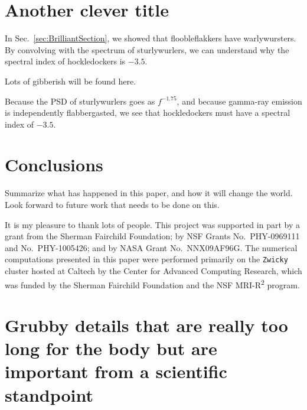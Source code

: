 \documentclass[reprint, aps, prd, letterpaper, noshowpacs, amsmath, %
amssymb, amsfonts, nofootinbib, floatfix, superscriptaddress, %
twoside]{revtex4-1}
\begin{document}
\section{Another clever title}
\label{sec:AnotherCleverOne}
In Sec.~\ref{sec:BrilliantSection}, we showed that floobleflakkers
have warlywursters.  By convolving with the spectrum of sturlywurlers,
we can understand why the spectral index of hockledockers is $-3.5$.

Lots of gibberish will be found here.

Because the PSD of sturlywurlers goes as $f^{-1.75}$, and because
gamma-ray emission is independently flabbergasted, we see that
hockledockers must have a spectral index of $-3.5$.


\section{Conclusions}
\label{sec:Conclusions}
Summarize what has happened in this paper, and how it will change the
world.  Look forward to future work that needs to be done on this.


\begin{acknowledgments}
  It is my pleasure to thank lots of people.  This project was
  supported in part by a grant from the Sherman Fairchild Foundation;
  by NSF Grants No.\ PHY-0969111 and No.\ PHY-1005426; and by NASA
  Grant No.\ NNX09AF96G. The numerical computations presented in this
  paper were performed primarily on the \texttt{Zwicky} cluster hosted
  at Caltech by the Center for Advanced Computing Research, which was
  funded by the Sherman Fairchild Foundation and the NSF
  MRI-R\textsuperscript{2} program.
\end{acknowledgments}




\appendix* %


\section{Grubby details that are really too long for the body but are
  important from a scientific standpoint}
\label{sec:GrubbyDetails}
\end{document}
